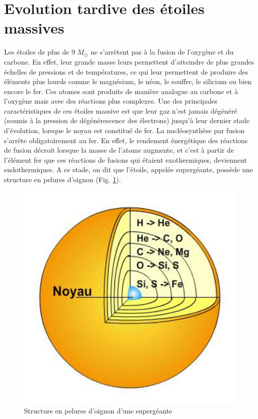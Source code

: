 \section{Evolution tardive des étoiles massives}\label{2.4}

Les étoiles de plus de 9 $M_\odot$ ne s’arrêtent pas à la fusion de l’oxygène et du carbone. En effet, leur grande masse leurs permettent d’atteindre de plus grandes échelles de pressions et de températures, ce qui leur permettent de produire des éléments plus lourds comme le magnésium, le néon, le souffre, le silicium ou bien encore le fer. Ces atomes sont produits de manière analogue au carbone et à l’oxygène mais avec des réactions plus complexes. Une des principales caractéristiques de ces étoiles massive est que leur gaz n’est jamais dégénéré (soumis à la pression de dégénérescence des électrons) jusqu’à leur dernier stade d’évolution, lorsque le noyau est constitué de fer. La nucléosynthèse par fusion s’arrête obligatoirement au fer. En effet, le rendement énergétique des réactions de fusion décroit lorsque la masse de l’atome augmente, et c’est à partir de l’élément fer que ces réactions de fusions qui étaient exothermiques, deviennent endothermiques. A ce stade, on dit que l’étoile, appelée supergéante, possède une structure en pelures d’oignon (Fig. \ref{Fig. 2.6}).

\begin{figure}[H]
	\centering
	\includegraphics[scale=0.3]{images/oignon}
	\caption[Structure en pelures d'oignon d'une supergéante\newline \url{https://media4.obspm.fr/public/ressources\_lu/pages\_vie-mort/impression.html}]{Structure en pelures d'oignon d'une supergéante}
	\label{Fig. 2.6}
\end{figure}\newpage

